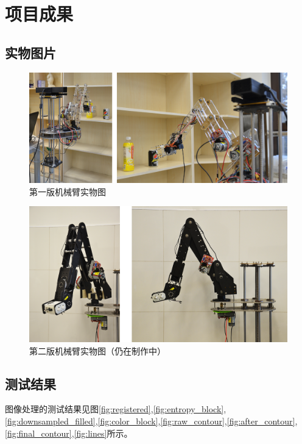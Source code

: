 
\section{项目成果}

\subsection{实物图片}

\begin{figure}[H]
    \includegraphics[width = \textwidth]{pictures/1.png}
    \caption{第一版机械臂实物图}
    \label{fig:1}
\end{figure}

\begin{figure}[H]
    \includegraphics[width = \textwidth]{pictures/2.png}
    \caption{第二版机械臂实物图（仍在制作中）}
    \label{fig:1}
\end{figure}
\subsection{测试结果}

图像处理的测试结果见图\ref{fig:registered},\ref{fig:entropy_block},\ref{fig:downsampled_filled},\ref{fig:color_block},\ref{fig:raw_contour},\ref{fig:after_contour},\ref{fig:final_contour},\ref{fig:lines}所示。

